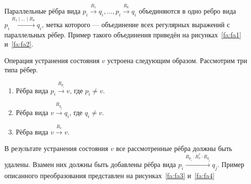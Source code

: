 Параллельные рёбра вида $p_i \xrightarrow{R_1} q_i, \ldots, p_i \xrightarrow{R_k} q_i$ объединяются в одно ребро вида $p_i \xrightarrow{R_1 \mid \ldots \mid R_k} q_i$, метка которого --- объединение всех регулярных выражений с параллельных рёбер.
Пример такого объединения приведён на рисунках~\ref{fa:fa1} и~\ref{fa:fa2}.

Операция устранения состояния $v$ устроена следующим образом. 
Рассмотрим три типа рёбер.
\begin{enumerate}
    \item Рёбра вида $p_i \xrightarrow{R_{p_i}} v$, где $p_i \neq v$.
    \item Рёбра вида $v \xrightarrow{R_{q_j}} q_i$, где $q_i \neq v$.
    \item Рёбра вида $v \xrightarrow{R_v} v$.
\end{enumerate}

В результате устранения состояния $v$ все рассмотренные рёбра должны быть удалены. 
Взамен них должны быть добавлены рёбра вида $p_i \xrightarrow{R_{p_i} \cdot R_v^* \cdot R_{q_j}} q_j$.
Пример описанного преобразования представлен на рисунках~\ref{fa:fa3} и~\ref{fa:fa4} 

